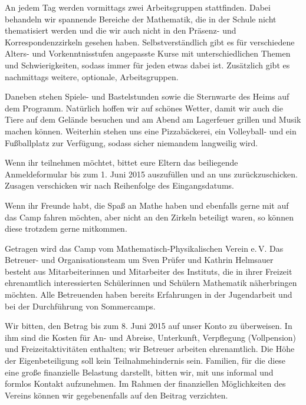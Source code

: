 \documentclass[12pt]{zettel}
\begin{document}
An jedem Tag werden vormittags zwei Arbeitsgruppen stattfinden. Dabei behandeln wir spannende
Bereiche der Mathematik, die in der Schule nicht thematisiert werden und die
wir auch nicht in den Präsenz- und Korrespondenzzirkeln gesehen haben.
Selbstverständlich gibt es für verschiedene Alters- und Vorkenntnisstufen angepasste Kurse
mit unterschiedlichen Themen und Schwierigkeiten, sodass immer für jeden
etwas dabei ist. Zusätzlich gibt es nachmittags weitere, optionale,
Arbeitsgruppen.

Daneben stehen Spiele- und Bastelstunden sowie die
Sternwarte des Heims auf dem Programm. Natürlich hoffen wir auf
schönes Wetter, damit wir auch die Tiere auf dem Gelände besuchen
und am Abend am Lagerfeuer grillen und Musik machen können.
Weiterhin stehen uns eine Pizzabäckerei, ein Volleyball- und ein
Fußballplatz zur Verfügung, sodass sicher niemandem langweilig
wird.

\vspace{\medskipamount}

\begin{minipage}{0.63\textwidth}
Wenn ihr teilnehmen möchtet, bittet eure Eltern das beiliegende Anmeldeformular
bis zum 1. Juni 2015 auszufüllen und an uns zurückzuschicken. Zusagen
verschicken wir nach Reihenfolge des Eingangsdatums.
\end{minipage}

\vspace{\medskipamount}

\begin{minipage}{0.4\textwidth}
Wenn ihr Freunde
habt, die Spaß an Mathe haben und ebenfalls gerne mit auf das
Camp fahren möchten, aber nicht an den Zirkeln beteiligt waren, so
können diese trotzdem gerne mitkommen.
\end{minipage}

\newpage

Getragen wird das Camp vom Mathematisch-Physikalischen Verein e.\,V. Das
Betreuer- und Organisationsteam um Sven Prüfer und Kathrin Helmsauer besteht
aus Mitarbeiterinnen und Mitarbeiter des Instituts, die in ihrer Freizeit
ehrenamtlich interessierten Schülerinnen und Schülern Mathematik näherbringen
möchten. Alle Betreuenden haben
bereits Erfahrungen in der Jugendarbeit und bei der Durch\-füh\-rung von
Sommercamps.

Wir bitten, den Betrag bis zum 8. Juni 2015 auf unser Konto zu überweisen.
In ihm sind die Kosten für An- und Abreise, Unterkunft, Verpflegung
(Vollpension) und Freizeitaktivitäten enthalten; wir Betreuer arbeiten
ehrenamtlich. Die Höhe der Eigenbeteiligung soll kein Teilnahmehindernis sein.
Familien, für die diese eine große finanzielle Belastung darstellt, bitten wir,
mit uns informal und formlos Kontakt aufzunehmen. Im Rahmen der finanziellen Möglichkeiten des
Vereins können wir gegebenenfalls auf den Beitrag verzichten.
\end{document}
